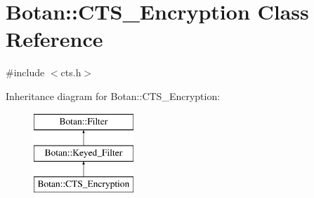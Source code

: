 \hypertarget{classBotan_1_1CTS__Encryption}{\section{Botan\-:\-:C\-T\-S\-\_\-\-Encryption Class Reference}
\label{classBotan_1_1CTS__Encryption}
}


{\ttfamily \#include $<$cts.\-h$>$}

Inheritance diagram for Botan\-:\-:C\-T\-S\-\_\-\-Encryption\-:\begin{figure}[H]
\begin{center}
\leavevmode
\includegraphics[height=3.000000cm]{classBotan_1_1CTS__Encryption}
\end{center}
\end{figure}
